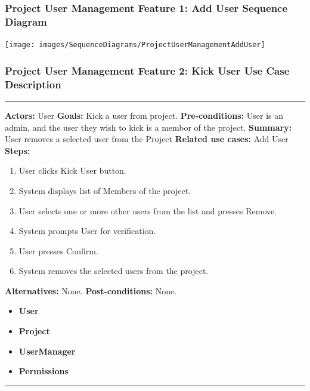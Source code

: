 \documentclass[twoside,letterpaper]{article}
\begin{document}
\subsubsection[Project User Management Feature 1: Add User Sequence Diagram]{\rmfamily\bfseries\color{black}
	Project User Management Feature 1: Add User Sequence Diagram}
\hypertarget{RefHeading22059017292}{}

\texttt{[image: images/SequenceDiagrams/ProjectUserManagementAddUser]}

\newpage
\subsubsection[Project User Management Feature 2: Kick User Use Case Description]{\rmfamily\bfseries\color{black}
	Project User Management Feature 2: Kick User Use Case Description}
\hypertarget{RefHeading22059017292}{}

\vspace{2pt}
\hrule
\vspace{8pt}
 \textbf{Actors:} User \newline
\textbf{Goals:} Kick a user from project. \newline
 \textbf{Pre-conditions:} User is an admin, and the user they wish to kick is a membor of the project. \newline
 \textbf{Summary:} User removes a selected user from the Project \newline
\textbf{Related use cases:} Add User \newline
\textbf{Steps:} \begin{enumerate}
  \item User clicks Kick User button.
  \item System displays list of Members of the project.
  \item User selects one or more other users from the list and presses Remove.
  \item System prompts User for verification.
  \item User presses Confirm.
  \item System removes the selected users from the project.
 \end{enumerate}
 \textbf{Alternatives:} None. \newline
 \textbf{Post-conditions:} None. \newline
\begin{itemize}
	\item \textbf{User}
	\item \textbf{Project}
	\item \textbf{UserManager}
	\item \textbf{Permissions}
\end{itemize}
\vspace{8pt}
\hrule
\newpage
\end{document}
